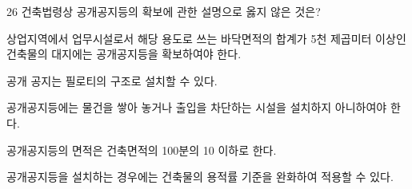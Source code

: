 \begin{question}{26}
건축법령상 공개공지등의 확보에 관한 설명으로 옳지 않은 것은?
\begin{choices}
  \item 상업지역에서 업무시설로서 해당 용도로 쓰는 바닥면적의 합계가 5천 제곱미터 이상인 건축물의 대지에는 공개공지등을 확보하여야 한다.
  \item 공개 공지는 필로티의 구조로 설치할 수 있다.
  \item 공개공지등에는 물건을 쌓아 놓거나 출입을 차단하는 시설을 설치하지 아니하여야 한다.
  \item 공개공지등의 면적은 건축면적의 100분의 10 이하로 한다.
  \item 공개공지등을 설치하는 경우에는 건축물의 용적률 기준을 완화하여 적용할 수 있다.
\end{choices}
\end{question}
